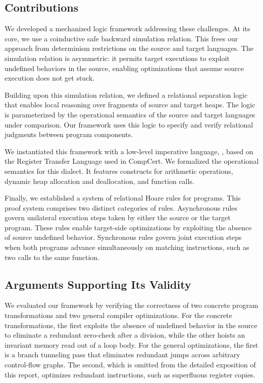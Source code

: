 \documentclass[report.tex]{subfiles}
\begin{document}
\subsection*{Contributions}
\label{sec:contributions}

We developed a mechanized logic framework addressing these challenges.
At its core,
we use a coinductive safe backward simulation relation.
This frees our approach from determinism restrictions
on the source and target languages.
The simulation relation is asymmetric:
it permits target executions to exploit undefined behaviors in the source,
enabling optimizations that assume source execution does not get stuck.

Building upon this simulation relation,
we defined a relational separation logic
that enables local reasoning over fragments of source and target heaps.
The logic is parameterized by the operational semantics
of the source and target languages under comparison.
Our framework uses this logic to specify
and verify relational judgments between program components.

We instantiated this framework with a low-level imperative language,
\muRTL{},
based on the Register Transfer Language used in CompCert.
We formalized the operational semantics for this \muRTL{} dialect.
It features constructs for arithmetic operations,
dynamic heap allocation and deallocation,
and function calls.

Finally,
we established a system of relational Hoare rules for \muRTL{} programs.
This proof system comprises two distinct categories of rules.
Asynchronous rules govern unilateral execution steps taken
by either the source or the target program.
These rules enable target-side optimizations by
exploiting the absence of source undefined behavior.
Synchronous rules govern joint execution steps when both programs
advance simultaneously on matching instructions,
such as two calls to the same function.

\subsection*{Arguments Supporting Its Validity}

We evaluated our framework by verifying the correctness
of two concrete program transformations
and two general compiler optimizations.
For the concrete transformations,
the first exploits the absence of undefined behavior in the source
to eliminate a redundant zero-check after a division,
while the other hoists an invariant memory read out of a loop body.
For the general optimizations,
the first is a branch tunneling pass that eliminates redundant jumps
across arbitrary control-flow graphs.
The second,
which is omitted from the detailed exposition of this report,
optimizes redundant instructions,
such as superfluous register copies.
\end{document}
